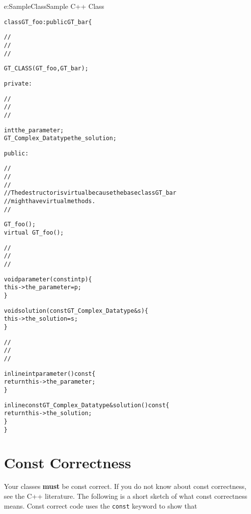 \begin{example}{e:SampleClass}{Sample C++ Class}
\begin{footnotesize}
\begin{alltt}
class GT_foo : public GT_bar \{

    //
    // 
    //

    GT_CLASS (GT_foo, GT_bar);

private:

    //
    // 
    //

    int the_parameter;
    GT_Complex_Datatype the_solution;

public:

    //
    // 
    //
    // The destructor is virtual because the base class GT_bar
    // might have virtual methods.
    //

    GT_foo ();
    virtual ~GT_foo ();

    //
    // 
    //

    void parameter (const int p) \{
        this->the_parameter = p;
    \}

    void solution (const GT_Complex_Datatype& s) \{
        this->the_solution = s;
    \}

    //
    // 
    //

    inline int parameter () const \{
        return this->the_parameter;
    \}

    inline const GT_Complex_Datatype& solution () const \{
        return this->the_solution;
    \}
\}
\end{alltt}
\end{footnotesize}
\end{example}



%
%

\section{Const Correctness}
\label{s:CS:ConstCorrectness}

Your classes \textbf{must} be const correct.  If you do not know
about const correctness, see the C++ literature.  The following
is a short sketch of what const correctness means.  Const correct
code uses the \texttt{const} keyword to show that

